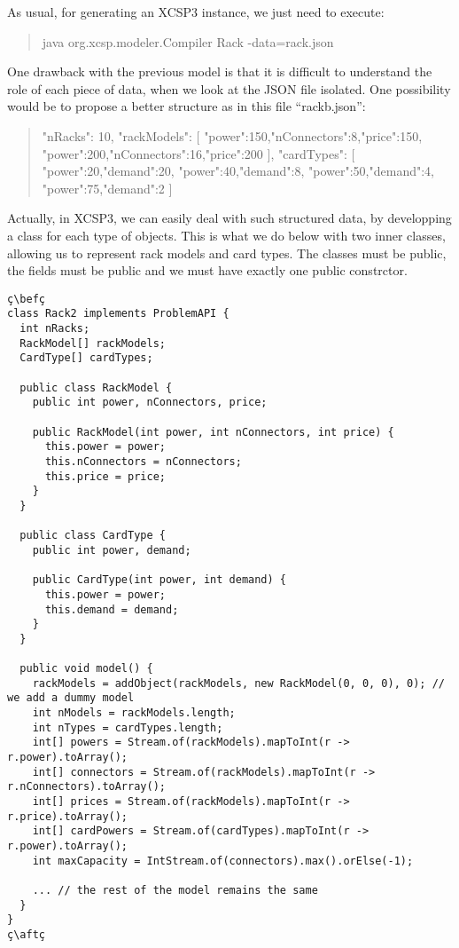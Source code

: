 \documentclass[10pt]{article}
\def\xt{{\rm XCSP3}\xspace}
\def\xt{{\rm XCSP3}\xspace}
\newenvironment{myvb}{\endgraf\small\verbatim}{\endverbatim}
\def\bef{\rule{10cm}{0.1mm}} %
\def\aft{\rule{10cm}{0.1mm}\medskip}
\begin{document}
As usual, for generating an \xt instance, we just need to execute: 
\begin{quote}
\begin{myvb}
java org.xcsp.modeler.Compiler Rack -data=rack.json
\end{myvb}
\end{quote}


One drawback with the previous model is that it is difficult to understand the role of each piece of data, when we look at the JSON file isolated.
One possibility would be to propose a better structure as in this file ``rackb.json'':

{\small
\begin{quote}
\begin{myvb}
{
  "nRacks": 10,
  "rackModels": [
    {"power":150,"nConnectors":8,"price":150},
    {"power":200,"nConnectors":16,"price":200}
  ],
  "cardTypes": [
    {"power":20,"demand":20},
    {"power":40,"demand":8},
    {"power":50,"demand":4},
    {"power":75,"demand":2}
  ]
}
\end{myvb}
\end{quote}
}


Actually, in \xt, we can easily deal with such structured data, by developping a class for each type of objects.
This is what we do below with two inner classes, allowing us to represent rack models and card types.
The classes must be public, the fields must be public and we must have exactly one public constrctor.


\begin{lstlisting}
ç\befç
class Rack2 implements ProblemAPI {
  int nRacks;
  RackModel[] rackModels;
  CardType[] cardTypes;
  
  public class RackModel {
    public int power, nConnectors, price;
    
    public RackModel(int power, int nConnectors, int price) {
      this.power = power;
      this.nConnectors = nConnectors;
      this.price = price;
    }
  }
  
  public class CardType {
    public int power, demand;
    
    public CardType(int power, int demand) {
      this.power = power;
      this.demand = demand;
    }
  }
  
  public void model() {
    rackModels = addObject(rackModels, new RackModel(0, 0, 0), 0); // we add a dummy model 
    int nModels = rackModels.length;
    int nTypes = cardTypes.length;
    int[] powers = Stream.of(rackModels).mapToInt(r -> r.power).toArray();
    int[] connectors = Stream.of(rackModels).mapToInt(r -> r.nConnectors).toArray();
    int[] prices = Stream.of(rackModels).mapToInt(r -> r.price).toArray();
    int[] cardPowers = Stream.of(cardTypes).mapToInt(r -> r.power).toArray();
    int maxCapacity = IntStream.of(connectors).max().orElse(-1);
    
    ... // the rest of the model remains the same
  }
}
ç\aftç
\end{lstlisting}
\end{document}
